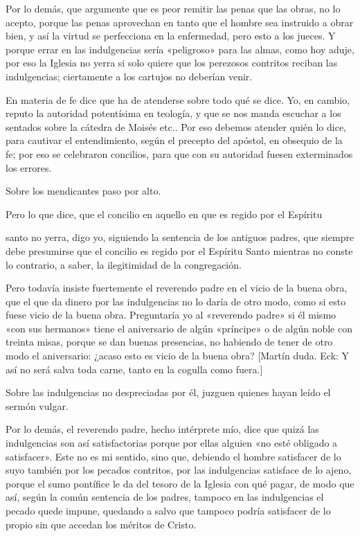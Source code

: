 Por lo demás, que argumente que es peor remitir las penas que las obras, no lo acepto, porque las penas aprovechan en tanto que el hombre sea instruido a obrar bien, y así la virtud se perfecciona en la enfermedad, pero esto a los jueces. Y porque errar en las indulgencias sería «peligroso» para las almas, como hoy aduje, por eso la Iglesia no yerra si solo quiere que los perezosos contritos reciban las indulgencias; ciertamente a los cartujos no deberían venir.

\marginpar{\small[358]} En materia de fe dice que ha de atenderse sobre todo qué se dice. Yo, en cambio, reputo la autoridad potentísima en teología, y que se nos manda escuchar a los sentados sobre la cátedra de Moisés etc.. Por eso debemos atender quién lo dice, para cautivar el entendimiento, según el precepto del apóstol, en obsequio de la fe; por eso se celebraron concilios, para que con su autoridad fuesen exterminados los errores.

Sobre los mendicantes paso por alto.

Pero lo que dice, que el concilio en aquello en que es regido por el Espíritu

santo no yerra, digo yo, siguiendo la sentencia de los antiguos padres, que siempre debe presumirse que el concilio es regido por el Espíritu Santo mientras no conste lo contrario, a saber, la ilegitimidad de la congregación.

Pero todavía insiste fuertemente el reverendo padre en el vicio de la buena obra, que el que da dinero por las indulgencias no lo daría de otro modo, como si esto fuese vicio de la buena obra. Preguntaría yo al «reverendo padre» si él mismo «con sus hermanos» tiene el aniversario de algún «príncipe» o de algún noble con treinta misas, porque se dan buenas presencias, no habiendo de tener de otro modo el aniversario: ¿acaso esto es vicio de la buena obra? [Martín duda. Eck: Y así no será salva toda carne, tanto en la cogulla como fuera.]

Sobre las indulgencias no despreciadas por él, juzguen quienes hayan leído el sermón vulgar.

Por lo demás, el reverendo padre, hecho intérprete mío, dice que quizá las indulgencias son así satisfactorias porque por ellas alguien «no esté obligado a satisfacer». Este no es mi sentido, sino que, debiendo el hombre satisfacer de lo suyo también por los pecados contritos, por las indulgencias satisface de lo ajeno, porque el sumo pontífice le da del tesoro de la Iglesia con qué pagar, de modo que así, según la común sentencia de los padres, tampoco en las indulgencias el pecado quede impune, quedando a salvo que tampoco podría satisfacer de lo propio sin que accedan los méritos de Cristo.

